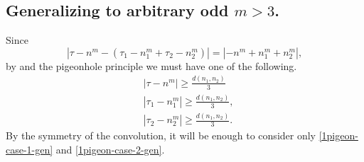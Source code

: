 \subsection{Generalizing to arbitrary odd $m >3$.}
%
%
Since $$| \tau - n^m - \left( \tau_1 - n_1^m 
+ \tau_2 - n_2^m  \right ) | = | - n^m + n_1^m +
n_2^m|,$$ by and
the pigeonhole principle we must have one of the 
following.
%
%
\begin{align}
	\label{1pigeon-case-1-gen}
	& |\tau - n^m| \ge \frac{d(n_1, n_2)}{3} 	\\
		\label{1pigeon-case-2-gen}
		& | \tau_1 - n_1^m | \ge \frac{d(n_1, n_2)}{3},		\\
		\label{1pigeon-case-3-gen}
		& | \tau_2 - n_2^m | \ge \frac{d(n_1, n_2)}{3}.
	\end{align}
%
%
By the symmetry of the convolution, it will be enough to consider only
\eqref{1pigeon-case-1-gen} and \eqref{1pigeon-case-2-gen}.
%
%
%
